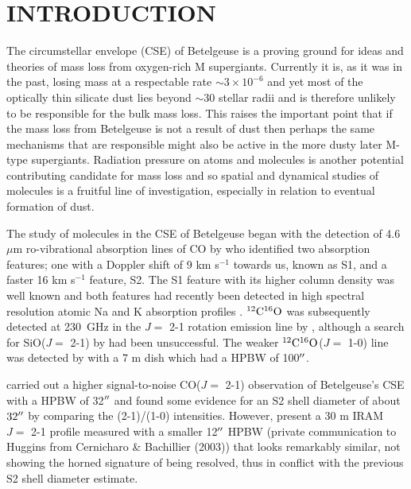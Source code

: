 \documentclass[preprint2]{aastex}
\begin{document}

\section{INTRODUCTION}

The circumstellar envelope (CSE) of Betelgeuse is a proving ground for ideas and theories of mass loss from oxygen-rich M supergiants. Currently it is, as it was in the past, losing mass at a respectable rate $\sim 3\times 10^{-6}$ \citep{1986ApJ...306..605G, 1994ApJ...424L.127H,harper_2001} and yet most of the optically thin silicate dust lies beyond $\sim 30$ stellar radii \citep{1994AJ....107.1469D} and is therefore unlikely to be responsible for the bulk mass loss. This raises the important point that if the mass loss from Betelgeuse is not a result of dust then perhaps the same mechanisms that are responsible might also be active in the more dusty later M-type supergiants. Radiation pressure on atoms and molecules is another potential contributing candidate for mass loss and so spatial and dynamical studies of molecules is a fruitful line of investigation, especially in relation to eventual formation of dust.

The study of molecules in the CSE of Betelgeuse began with the detection of 4.6 $\mu$m ro-vibrational absorption lines of CO by \cite{1979ApJ...233L.135B} who identified two absorption features; one with a Doppler shift of 9 km s${}^{-1}$ towards us, known as S1, and a faster 16 km s${}^{-1}$ feature, S2. The S1 feature with its higher column density was well known \citep{1962ApJ...136..844W} and both features had recently been detected in high spectral resolution atomic Na and K absorption profiles \citep{1975ApJ...199..427G}. $\rm{{}^{12}C^{16}O}$ was subsequently detected at 230~GHz in the $J=$ 2-1 rotation emission line by \cite{1980ApJ...242L..25K}, although a search for SiO($J=$ 2-1) by \cite{1978ApJ...221..854L} had been unsuccessful. The weaker $\rm{{}^{12}C^{16}O}$($J=$ 1-0) line was detected by \cite{1985ApJ...292..640K} with a 7 m dish which had a HPBW of 100$\mbox{$^{\prime\prime}$}$.

\cite{1987ApJ...313..400H} carried out a higher signal-to-noise CO($J=$ 2-1) observation of Betelgeuse's CSE with a  HPBW of 32$\mbox{$^{\prime\prime}$}$ and found some evidence for an S2 shell diameter of about $32\mbox{$^{\prime\prime}$}$ by comparing the  (2-1)/(1-0) intensities. However, \cite{1994ApJ...424L.127H} present a 30 m IRAM $J=$ 2-1 profile measured with a smaller 12$\mbox{$^{\prime\prime}$}$ HPBW (private communication to Huggins from Cernicharo \& Bachillier (2003)) that  looks remarkably similar, not showing the horned signature of being resolved, thus in conflict with the previous S2 shell diameter estimate.
\end{document}
